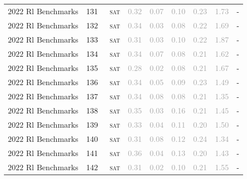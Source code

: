 \begin{center}
{\begin{longtable}{@{}lllllllll@{}}
2022 Rl Benchmarks & 131 & ~\textsc{sat} & \textcolor{darkgray}{0.32} & \textcolor{darkgray}{0.07} & \textcolor{darkgray}{0.10} & \textcolor{darkgray}{0.23} & \textcolor{darkgray}{1.73} & - \\
2022 Rl Benchmarks & 132 & ~\textsc{sat} & \textcolor{darkgray}{0.34} & \textcolor{darkgray}{0.03} & \textcolor{darkgray}{0.08} & \textcolor{darkgray}{0.22} & \textcolor{darkgray}{1.69} & - \\
2022 Rl Benchmarks & 133 & ~\textsc{sat} & \textcolor{darkgray}{0.31} & \textcolor{darkgray}{0.03} & \textcolor{darkgray}{0.10} & \textcolor{darkgray}{0.22} & \textcolor{darkgray}{1.87} & - \\
2022 Rl Benchmarks & 134 & ~\textsc{sat} & \textcolor{darkgray}{0.34} & \textcolor{darkgray}{0.07} & \textcolor{darkgray}{0.08} & \textcolor{darkgray}{0.21} & \textcolor{darkgray}{1.62} & - \\
2022 Rl Benchmarks & 135 & ~\textsc{sat} & \textcolor{darkgray}{0.28} & \textcolor{darkgray}{0.02} & \textcolor{darkgray}{0.08} & \textcolor{darkgray}{0.21} & \textcolor{darkgray}{1.67} & - \\
2022 Rl Benchmarks & 136 & ~\textsc{sat} & \textcolor{darkgray}{0.34} & \textcolor{darkgray}{0.05} & \textcolor{darkgray}{0.09} & \textcolor{darkgray}{0.23} & \textcolor{darkgray}{1.49} & - \\
2022 Rl Benchmarks & 137 & ~\textsc{sat} & \textcolor{darkgray}{0.34} & \textcolor{darkgray}{0.08} & \textcolor{darkgray}{0.08} & \textcolor{darkgray}{0.21} & \textcolor{darkgray}{1.35} & - \\
2022 Rl Benchmarks & 138 & ~\textsc{sat} & \textcolor{darkgray}{0.35} & \textcolor{darkgray}{0.03} & \textcolor{darkgray}{0.16} & \textcolor{darkgray}{0.21} & \textcolor{darkgray}{1.45} & - \\
2022 Rl Benchmarks & 139 & ~\textsc{sat} & \textcolor{darkgray}{0.33} & \textcolor{darkgray}{0.04} & \textcolor{darkgray}{0.11} & \textcolor{darkgray}{0.20} & \textcolor{darkgray}{1.50} & - \\
2022 Rl Benchmarks & 140 & ~\textsc{sat} & \textcolor{darkgray}{0.31} & \textcolor{darkgray}{0.08} & \textcolor{darkgray}{0.12} & \textcolor{darkgray}{0.24} & \textcolor{darkgray}{1.34} & - \\
2022 Rl Benchmarks & 141 & ~\textsc{sat} & \textcolor{darkgray}{0.36} & \textcolor{darkgray}{0.04} & \textcolor{darkgray}{0.13} & \textcolor{darkgray}{0.20} & \textcolor{darkgray}{1.43} & - \\
2022 Rl Benchmarks & 142 & ~\textsc{sat} & \textcolor{darkgray}{0.31} & \textcolor{darkgray}{0.02} & \textcolor{darkgray}{0.10} & \textcolor{darkgray}{0.21} & \textcolor{darkgray}{1.55} & - \\

\end{longtable}}
\end{center}
